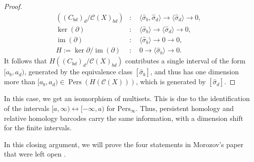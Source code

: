 \begin{proof}{\textit{\cite[Proof of Proposition 2.4]{de2011dualities}}}
\begin{align}
((C_{bd})_d/\mathcal{C}(X)_{bd}) &: \quad \langle \hat{\sigma}_b, \hat{\sigma}_d \rangle \rightarrow \langle \hat{\sigma}_d \rangle \rightarrow 0,\nonumber\\
\ker(\partial) &: \quad \langle \hat{\sigma}_b \rangle \rightarrow \langle \hat{\sigma}_d \rangle \rightarrow 0, \nonumber\\
\operatorname{im}(\partial) &: \quad \langle \hat{\sigma}_b \rangle \rightarrow 0 \rightarrow 0,\nonumber\\
H := \ker{\partial} / \operatorname{im}(\partial) &: \quad 0 \rightarrow \langle \hat{\sigma}_b \rangle \rightarrow 0.
\end{align}
It follows that $H((C_{bd})_d/\mathcal{C}(X)_{bd})$ contributes a single interval of the form $[a_b,a_d)$, generated by the equivalence class $[\hat{\sigma}_b]$, and thus has one dimension more than $[a_b,a_d) \in \operatorname{Pers}(H(\mathcal{C}(X)))$, which is generated by $[\hat{\sigma}_d]$.
\end{proof}

\begin{remark}{\cite[Proposition 2.4]{de2011dualities}}
	In this case, we get an isomorphism of multisets. This is due to the identification
	of the intervals $[a,\infty) \leftrightarrow [-\infty, a)$ for $\mathrm{Pers}_{\infty}$.
	Thus, persistent homology and relative homology barcodes carry the same information,
	with a dimension shift for the finite intervals.
\end{remark}

In this closing argument, we will prove the four statements in Morozov's paper that were left open \cite[\S 2.8]{de2011dualities}.

